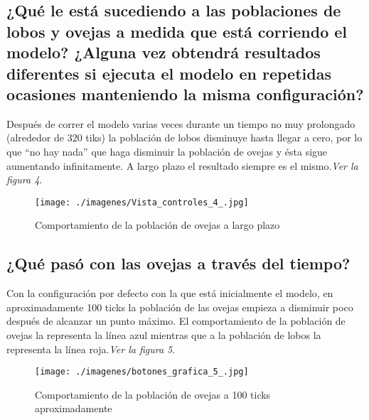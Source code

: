 \documentclass[12pt,letterpaper]{article}
\begin{document}
\vspace{2cm}
\subsection{¿Qué le está sucediendo a las poblaciones de lobos y ovejas a medida que está corriendo el modelo? ¿Alguna vez obtendrá resultados diferentes si ejecuta el modelo en repetidas ocasiones manteniendo la misma configuración?}

Después de correr el modelo varias veces durante un tiempo no muy prolongado (alrededor de 320 tiks) la población de lobos disminuye hasta llegar a cero, por lo que “no hay nada” que haga disminuir la población de ovejas y ésta sigue aumentando infinitamente. A largo plazo el resultado siempre es el mismo.\textit{Ver la figura 4}.
\vspace{5cm}

\begin{figure}[h!]
\begin{floatrow}
\centering
\caption{Comportamiento de la población de ovejas a largo plazo}
\texttt{[image: ./imagenes/Vista\_controles\_4\_.jpg]}
\label{fig: comportamiento con mas de 300 ticks}
\end{floatrow}
\end{figure}

\subsection{¿Qué pasó con las ovejas a través del tiempo?}

Con la configuración por defecto con la que está inicialmente el modelo, en aproximadamente 100 ticks la población de las ovejas empieza a disminuir poco después de alcanzar un punto máximo. El comportamiento de la población de ovejas la representa la línea azul mientras que a la población de lobos la representa la línea roja.\textit{Ver la figura 5}.

\begin{figure}[h!]
\begin{floatrow}
\centering
\caption{Comportamiento de la población de ovejas a 100 ticks aproximadamente}
\texttt{[image: ./imagenes/botones\_grafica\_5\_.jpg]}
\label{fig: vista}
\end{floatrow}
\end{figure}
\vspace{5cm}
\end{document}
